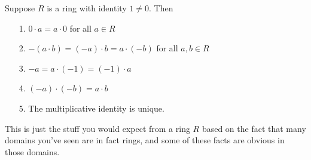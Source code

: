 \documentclass[12pt,letterpaper]{algebra_book}
\theoremstyle{definition}
\begin{document}
\begin{proposition}
    Suppose $R$ is a ring with identity $1 \ne 0$. Then 
    \begin{itemize}
        \item[1.] $0 \cdot a = a \cdot 0$ for all $a \in R$ 
        \item[2.] $-(a \cdot b) = (-a) \cdot b = a \cdot (-b)$ for
        all $a, b \in R$ 
        \item[3.] $-a = a \cdot (-1) = (-1) \cdot a$
        \item[4.] $(-a) \cdot (-b) =  a \cdot b$ 
        \item[5.] The multiplicative identity is unique.   
    \end{itemize}
\end{proposition}
This is just the stuff you would expect from a ring $R$ based
on the fact that many domains you've seen are in fact rings,
and some of these facts are obvious in those domains.
\end{document}
